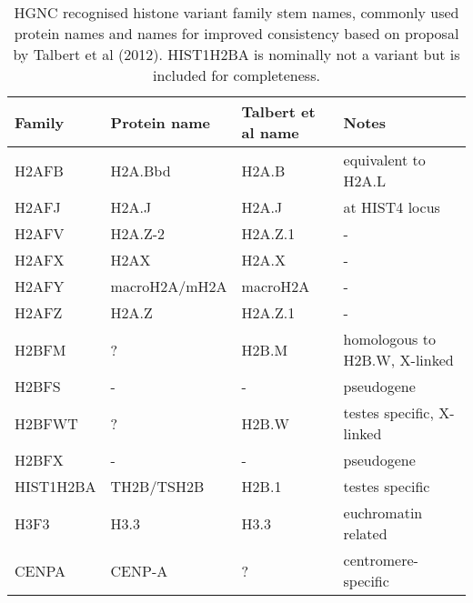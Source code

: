   \begin{table*}
    \caption{HGNC recognised histone variant family stem names, commonly used protein names 
	and names for improved consistency based on proposal by Talbert et al (2012). 
	HIST1H2BA is nominally not a variant but is included for completeness.}
    \label{tab:histone-variant-families}
    \centering
    \begin{tabular}{l l l}
      \toprule
      Family & Protein name & Talbert et al name & Notes \\
      \midrule
	  H2AFB & H2A.Bbd & H2A.B & equivalent to H2A.L \\
	  H2AFJ & H2A.J & H2A.J & at HIST4 locus \\
	  H2AFV & H2A.Z-2 & H2A.Z.1 & - \\
	  H2AFX & H2AX & H2A.X & - \\
	  H2AFY & macroH2A/mH2A & macroH2A & - \\
	  H2AFZ & H2A.Z & H2A.Z.1 & - \\
	  H2BFM & ? & H2B.M & homologous to H2B.W, X-linked\\
	  H2BFS & - & - & pseudogene \\
	  H2BFWT & ? & H2B.W & testes specific, X-linked \\
	  H2BFX & - & - & pseudogene \\
	  HIST1H2BA & TH2B/TSH2B & H2B.1 & testes specific \\
	  H3F3 & H3.3 & H3.3 & euchromatin related \\
	  CENPA & CENP-A & ? & centromere-specific \\
	\bottomrule
    \end{tabular}
  \end{table*}

